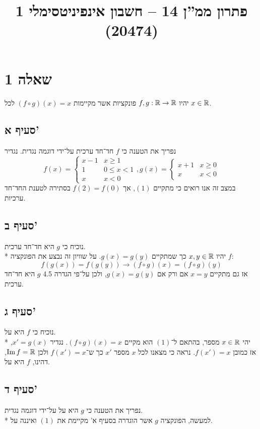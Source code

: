 
\title{פתרון ממ''ן 14 – חשבון אינפיניטסימלי 1 (20474)}


\maketitle
\section{שאלה 1}
יהיו $f, g: \mathbb{R} \to \mathbb{R}$ פונקציות אשר מקיימות $(f \circ g)(x) = x$\footnotemark{} לכל $x \in \mathbb{R}$.
\subsection{סעיף א'}
נפריך את הטענה כי $f$ חד־חד ערכית על־ידי דוגמה נגדית. נגדיר
\[
	f(x) = \begin{cases}
		x - 1 & x \ge 1 \\
		1 & 0 \le x < 1 \\
		x & x < 0
	\end{cases},
	g(x) = \begin{cases}
		x + 1 & x \ge 0 \\
		x & x < 0
	\end{cases}
\]
במצב זה אנו רואים כי מתקיים $(1)$, אך $f(2) = f(0)$ בסתירה לטענת החד־חד ערכיות.

\subsection{סעיף ב'}
נוכיח כי $g$ היא חד־חד ערכית. \\*
יהיו $x, y \in \mathbb{R}$ כך שמתקיים $g(x) = g(y)$.
על שוויון זה נבצע את הפונקציה $f$:
\[
	f(g(x)) = f(g(y))
	\rightarrow
	(f \circ g)(x) = (f \circ g)(y)
\]
אז גם מתקיים $x = y$ אם ורק אם $g(x) = g(y)$, ולכן על־פי הגדרה 4.5 $g$ היא חד־חד ערכית.

\subsection{סעיף ג'}
נוכיח כי $f$ היא על. \\*
יהי $x \in \mathbb{R}$ מספר, בהתאם ל־$(1)$ הוא מקיים $(f \circ g)(x) = x$.
נגדיר $x' = g(x)$, אז כמובן $f(x') = x$.
נראה כי מצאנו לכל $x$ מספר $x'$ כך ש־$f(x') = x$ ולכן $\operatorname{Im} f = \mathbb{R}$, דהינו, $f$ היא על.

\subsection{סעיף ד'}
נפריך את הטענה כי $g$ היא על על־ידי דוגמה נגדית. \\*
למעשה, הפונקציה $g$ אשר הוגדרה בסעיף א' מקיימת את $(1)$ ואיננה על.

